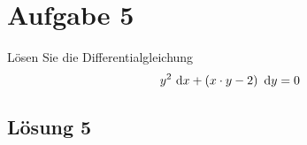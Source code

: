 \documentclass[main.tex]{subfiles}
\begin{document}
\section{Aufgabe 5}
Lösen Sie die Differentialgleichung
\[
    y^2 ~\mathrm{d}x + \left( x \cdot y - 2 \right) ~\mathrm{d}y = 0
\]

\subsection{Lösung 5}
\end{document}
